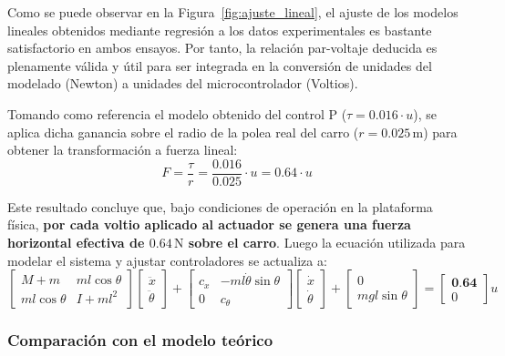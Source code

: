 \documentclass[11pt,fleqn]{book} %
\begin{document}
\FloatBarrier

Como se puede observar en la Figura~\ref{fig:ajuste_lineal}, el ajuste de los modelos lineales obtenidos mediante regresión a los datos experimentales es bastante satisfactorio en ambos ensayos. Por tanto, la relación par-voltaje deducida es plenamente válida y útil para ser integrada en la conversión de unidades del modelado (Newton) a unidades del microcontrolador (Voltios).

Tomando como referencia el modelo obtenido del control P ($\tau = 0.016 \cdot u$), se aplica dicha ganancia sobre el radio de la polea real del carro ($r = 0.025\,\text{m}$) para obtener la transformación a fuerza lineal:
\begin{equation}
	F = \frac{\tau}{r} = \frac{0.016}{0.025} \cdot u = 0.64 \cdot u
\end{equation}

Este resultado concluye que, bajo condiciones de operación en la plataforma física, \textbf{por cada voltio aplicado al actuador se genera una fuerza horizontal efectiva de $0.64\,\text{N}$ sobre el carro}. Luego la ecuación utilizada para modelar el sistema y ajustar controladores se actualiza a:
\begin{equation}
	\begin{bmatrix} 
		M + m & m l \cos\theta \\ 
		m l \cos\theta & I + m l^2 
	\end{bmatrix} 
	\begin{bmatrix} 
		\ddot{x} \\ 
		\ddot{\theta} 
	\end{bmatrix} 
	+ 
	\begin{bmatrix} 
		c_x & -m l \dot{\theta} \sin\theta \\ 
		0 & c_\theta 
	\end{bmatrix} 
	\begin{bmatrix} 
		\dot{x} \\ 
		\dot{\theta} 
	\end{bmatrix} 
	+ 
	\begin{bmatrix} 
		0 \\ 
		m g l \sin\theta 
	\end{bmatrix} 
	= 
	\begin{bmatrix} 
		\textbf{0.64} \\ 
		0 
	\end{bmatrix} u
	\label{eq:matrices_dinamica_desarrollada_converison}
\end{equation}


\subsubsection{Comparación con el modelo teórico}
\end{document}
